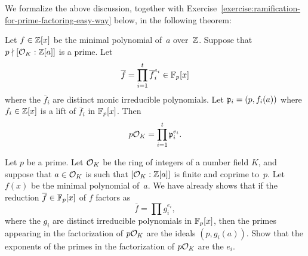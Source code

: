 We formalize the above discussion, together with
Exercise~\ref{exercise:ramification-for-prime-factoring-easy-way} below,
in the following theorem:
\begin{theorem}\label{thm:fac1}
	Let $f\in\mathbb{Z}[x]$ be the minimal polynomial of~$a$ over~$\mathbb{Z}$.
	Suppose that~$p\nmid [\mathcal{O}_K:\mathbb{Z}[a]]$ is a prime. Let
	$$
		\overline{f} = \prod_{i=1}^t \overline{f}_i^{e_i} \in \mathbb{F}_p[x]
	$$
	where the $\overline{f}_i$ are distinct monic irreducible
	polynomials. Let $\mathfrak{p}_i = (p,f_i(a))$ where $f_i\in\mathbb{Z}[x]$ is a
	lift of $\overline{f}_i$ in $\mathbb{F}_p[x]$. Then
	$$
		p\mathcal{O}_K = \prod_{i=1}^t \mathfrak{p}_i^{e_i}.
	$$
\end{theorem}

\begin{exercise}\label{exercise:ramification-for-prime-factoring-easy-way}
	Let $p$ be a prime. Let $\mathcal{O}_K$ be the ring of integers of a number
	field $K$, and suppose that $a\in \mathcal{O}_K$ is such that $[\mathcal{O}_K:\mathbb{Z}[a]]$ is
	finite and coprime to~$p$. Let $f(x)$ be the minimal polynomial of~$a$.
	We have already shows that if the reduction $\overline{f}\in\mathbb{F}_p[x]$ of $f$
	factors as
	$$
		\overline{f} = \prod g_i^{e_i},
	$$
	where the $g_i$ are distinct irreducible polynomials in $\mathbb{F}_p[x]$,
	then the primes appearing in the factorization of $p\mathcal{O}_K$ are the
	ideals $(p,g_i(a))$. Show that the exponents of the primes in the
	factorization of $p\mathcal{O}_K$ are the $e_i$.
\end{exercise}



